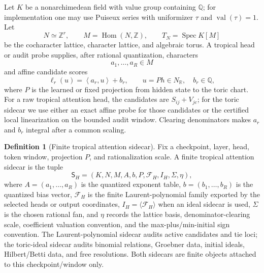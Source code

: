 \documentclass[11pt]{article}
\theoremstyle{definition}
\newtheorem{definition}{Definition}[section]
\theoremstyle{plain}
\theoremstyle{remark}
\numberwithin{equation}{section}
\newcommand{\R}{\mathbb{R}}
\newcommand{\Z}{\mathbb{Z}}
\newcommand{\Q}{\mathbb{Q}}
\newcommand{\ip}[2]{\left\langle #1,#2\right\rangle}
\begin{document}
Let $K$ be a nonarchimedean field with value group containing $\Q$; for implementation one may use Puiseux series with uniformizer $\tau$ and $\operatorname{val}(\tau)=1$.  Let
\begin{equation}
  N\simeq \Z^r,\qquad M=\operatorname{Hom}(N,\Z),
  \qquad T_N=\operatorname{Spec}K[M]
\end{equation}
be the cocharacter lattice, character lattice, and algebraic torus.  A tropical head or audit probe supplies, after rational quantization, characters
\begin{equation}
  a_1,\ldots,a_R\in M
\end{equation}
and affine candidate scores
\begin{equation}
  \ell_r(u)=\ip{a_r}{u}+b_r,\qquad u=P h\in N_\R,\quad b_r\in\Q,
\end{equation}
where $P$ is the learned or fixed projection from hidden state to the toric chart.  For a raw tropical attention head, the candidates are $S_{ij}+V_{jc}$; for the toric sidecar we use either an exact affine probe for those candidates or the certified local linearization on the bounded audit window.  Clearing denominators makes $a_r$ and $b_r$ integral after a common scaling.

\begin{definition}[Finite tropical attention sidecar]
Fix a checkpoint, layer, head, token window, projection $P$, and rationalization scale.  A finite tropical attention sidecar is the tuple
\begin{equation}
  \mathsf S_H=(K,N,M,A,b,P,\mathcal F_H,I_H,\Sigma,\eta),
\end{equation}
where $A=(a_1,\ldots,a_R)$ is the quantized exponent table, $b=(b_1,\ldots,b_R)$ is the quantized bias vector, $\mathcal F_H$ is the finite Laurent-polynomial family exported by the selected heads or output coordinates, $I_H=\langle\mathcal F_H\rangle$ when an ideal sidecar is used, $\Sigma$ is the chosen rational fan, and $\eta$ records the lattice basis, denominator-clearing scale, coefficient valuation convention, and the max-plus/min-initial sign convention.  The Laurent-polynomial sidecar audits active candidates and tie loci; the toric-ideal sidecar audits binomial relations, Groebner data, initial ideals, Hilbert/Betti data, and free resolutions.  Both sidecars are finite objects attached to this checkpoint/window only.
\end{definition}
\end{document}
